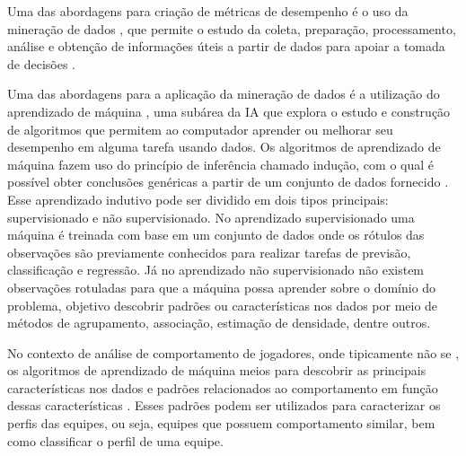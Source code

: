 Uma das abordagens para  criação de métricas de desempenho é o uso da mineração de dados \cite{el2016game}, que permite o estudo da coleta, preparação, processamento, análise e obtenção de informações úteis a partir de dados para apoiar a tomada de decisões \cite{aggarwal2015data}.

Uma das abordagens para a aplicação da mineração de dados é a utilização do aprendizado de máquina \cite{aggarwal2015data}, uma subárea da IA que explora o estudo e construção de algoritmos que permitem ao computador aprender ou melhorar seu desempenho em alguma tarefa usando dados. Os algoritmos de aprendizado de máquina fazem uso do princípio de inferência chamado indução, com o qual é possível obter conclusões genéricas a partir de um conjunto de dados fornecido \cite{lorena2007introduccao}. Esse aprendizado indutivo pode ser dividido em dois tipos principais: supervisionado e não supervisionado. No aprendizado supervisionado uma máquina é treinada com base em um conjunto de dados onde os rótulos das observações são previamente conhecidos para realizar tarefas de previsão, classificação e regressão. Já no aprendizado não supervisionado não existem observações rotuladas para que a máquina possa aprender sobre o domínio do problema,  objetivo  descobrir padrões ou características nos dados \cite{sathya2013comparison} por meio de métodos de agrupamento, associação, estimação de densidade, dentre outros.

No contexto de análise de comportamento de jogadores, onde tipicamente não se , os algoritmos de aprendizado de máquina  meios para descobrir as principais características nos dados e padrões relacionados ao comportamento em função dessas características \cite{el2016game}. Esses padrões podem ser utilizados para caracterizar os perfis das equipes, ou seja, equipes que possuem comportamento similar, bem como classificar o perfil de uma equipe.

